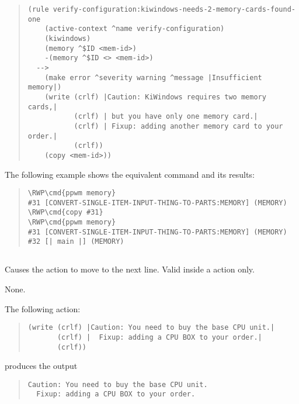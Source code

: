 \begin{quote}
\begin{verbatim}
(rule verify-configuration:kiwindows-needs-2-memory-cards-found-one
    (active-context ^name verify-configuration)
    (kiwindows)
    (memory ^$ID <mem-id>)
    -(memory ^$ID <> <mem-id>)
  -->
    (make error ^severity warning ^message |Insufficient memory|)
    (write (crlf) |Caution: KiWindows requires two memory cards,|
           (crlf) | but you have only one memory card.|
           (crlf) | Fixup: adding another memory card to your order.|
           (crlf))
    (copy <mem-id>))
\end{verbatim}
\end{quote}

The following example shows the equivalent  command and its
results:

\begin{quote}
\begin{Verbatim}[commandchars=\\\{\}]
\RWP\cmd{ppwm memory}
#31 [CONVERT-SINGLE-ITEM-INPUT-THING-TO-PARTS:MEMORY] (MEMORY)
\RWP\cmd{copy #31}
\RWP\cmd{ppwm memory}
#31 [CONVERT-SINGLE-ITEM-INPUT-THING-TO-PARTS:MEMORY] (MEMORY)
#32 [| main |] (MEMORY)
\end{Verbatim}
\end{quote}

\subsection{}

Causes the  action to move to the next line. Valid inside a
 action only.

\Format


\Arguments

None.

\Example

The following  action:

\begin{quote}
\begin{verbatim}
(write (crlf) |Caution: You need to buy the base CPU unit.|
       (crlf) |  Fixup: adding a CPU BOX to your order.|
       (crlf))
\end{verbatim}
\end{quote}

produces the output

\begin{quote}
\begin{verbatim}
Caution: You need to buy the base CPU unit.
  Fixup: adding a CPU BOX to your order.
\end{verbatim}
\end{quote}


